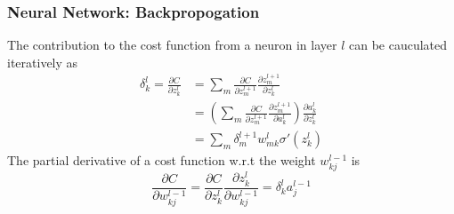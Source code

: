 \documentclass[notheorems, aspectratio=54]{beamer}
\begin{document}
\begin{frame}

\frametitle{Neural Network: Backpropogation}
The contribution to the cost function from a neuron in layer $l$ can be cauculated iteratively as
\begin{align*}
\delta^l_k=\frac{\partial C}{\partial z_k^l}&=\sum_m \frac{\partial C}{\partial z_m^{l+1}}\frac{\partial z_m^{l+1}}{\partial z_k^l}\\
&=\left(\sum_m \frac{\partial C}{\partial z_m^{l+1}}\frac{\partial z_m^{l+1}}{\partial a_k^l}\right)\frac{\partial a_k^l}{\partial z_k^l}\\
&=\sum_m \delta^{l+1}_m w^l_{mk}\sigma'(z_k^l)
\end{align*}
The partial derivative of a cost function w.r.t the weight $w_{kj}^{l-1}$ is 
$$
\frac{\partial C}{\partial w_{kj}^{l-1}}=\frac{\partial C}{\partial z_k^l}\frac{\partial z_k^l}{\partial w_{kj}^{l-1}}=\delta^l_k a^{l-1}_j
$$
\end{frame}
\end{document}
